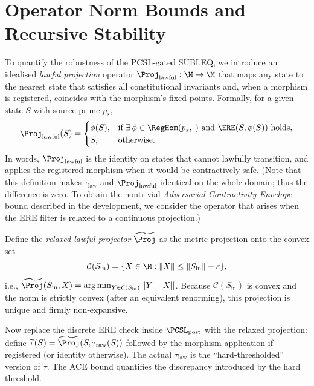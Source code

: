 \documentclass[11pt,a4paper]{article}
\theoremstyle{definition}
\theoremstyle{remark}
\newcommand{\norm}[1]{\|#1\|}
\begin{document}
\section{Operator Norm Bounds and Recursive Stability}
\label{sec:ace}
To quantify the robustness of the PCSL‑gated SUBLEQ, we introduce an idealised \emph{lawful projection} operator $\Proj_{\text{lawful}} : \M \to \M$ that maps any state to the nearest state that satisfies all constitutional invariants and, when a morphism is registered, coincides with the morphism's fixed points. Formally, for a given state $S$ with source prime $p_s$,
\[
\Proj_{\text{lawful}}(S) = 
\begin{cases}
\phi(S), & \text{if } \exists\, \phi \in \RegHom(p_s, \cdot) \text{ and } \ERE(S, \phi(S)) \text{ holds}, \\
S, & \text{otherwise}.
\end{cases}
\]
In words, $\Proj_{\text{lawful}}$ is the identity on states that cannot lawfully transition, and applies the registered morphism when it would be contractively safe. (Note that this definition makes $\tau_{\text{law}}$ and $\Proj_{\text{lawful}}$ identical on the whole domain; thus the difference is zero. To obtain the nontrivial \emph{Adversarial Contractivity Envelope} bound described in the development, we consider the operator that arises when the ERE filter is relaxed to a continuous projection.)

Define the \emph{relaxed lawful projector} $\widetilde{\Proj}$ as the metric projection onto the convex set
\[
\mathcal{C}(S_{\text{in}}) = \{ X \in \M : \norm{X} \le \norm{S_{\text{in}}} + \varepsilon \},
\]
i.e., $\widetilde{\Proj}(S_{\text{in}}, X) = \arg\min_{Y \in \mathcal{C}(S_{\text{in}})} \norm{Y - X}$. Because $\mathcal{C}(S_{\text{in}})$ is convex and the norm is strictly convex (after an equivalent renorming), this projection is unique and firmly non‑expansive.

Now replace the discrete ERE check inside $\PCSL_{\text{post}}$ with the relaxed projection: define $\widetilde{\tau}(S) = \widetilde{\Proj}(S, \tau_{\text{raw}}(S))$ followed by the morphism application if registered (or identity otherwise). The actual $\tau_{\text{law}}$ is the ``hard‑thresholded'' version of $\widetilde{\tau}$. The ACE bound quantifies the discrepancy introduced by the hard threshold.
\end{document}
